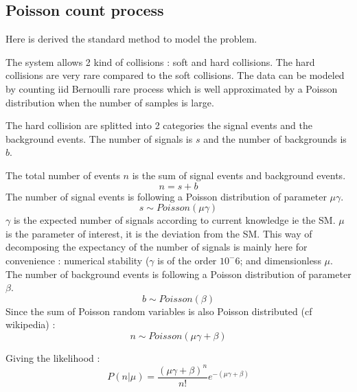 \subsection{Poisson count process} %
\label{sub:poisson_count_process}

Here is derived the standard method to model the problem.

The system allows 2 kind of collisions : soft and hard collisions.
The hard collisions are very rare compared to the soft collisions.
The data can be modeled by counting iid Bernoulli rare process which is well approximated by a Poisson distribution \needcite when the number of samples is large.


The hard collision are splitted into 2 categories the signal events and the background events.
The number of signals is $s$ and the number of backgrounds is $b$.

The total number of events $n$ is the sum of signal events and background events.
\begin{equation}
	n = s + b
\end{equation}
The number of signal events is following a Poisson distribution of parameter $\mu \gamma$.
\begin{equation}
	s \sim Poisson(\mu \gamma)
\end{equation}
$\gamma$ is the expected number of signals according to current knowledge ie the SM.
$\mu$ is the parameter of interest, it is the deviation from the SM.
This way of decomposing the expectancy of the number of signals is mainly here for convenience : numerical stability ($\gamma$ is of the order $10^-6$\needcite; and dimensionless $\mu$.
The number of background events is following a Poisson distribution of parameter $\beta$.
\begin{equation}
	b \sim Poisson(\beta)
\end{equation}
Since the sum of Poisson random variables is also Poisson distributed \needcite (cf wikipedia) :
\begin{equation}
	n \sim Poisson(\mu \gamma + \beta)
\end{equation}

Giving the likelihood :
\begin{equation}
	P(n| \mu) = \frac{(\mu \gamma +\beta)^n }{n!} e^{-(\mu \gamma +\beta)}
\end{equation}

